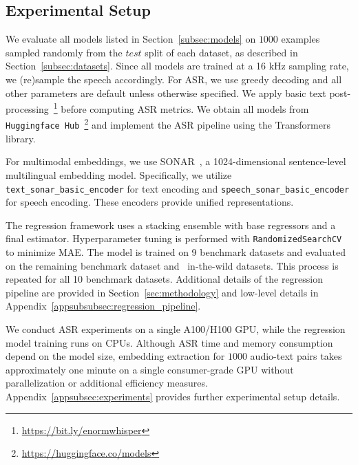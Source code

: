 \subsection{Experimental Setup}

We evaluate all models listed in Section~\ref{subsec:models} on $1000$ examples sampled randomly from the $test$ split of each dataset, as described in Section~\ref{subsec:datasets}. Since all models are trained at a 16 kHz sampling rate, we (re)sample the speech accordingly. For ASR, we use greedy decoding and all other parameters are default unless otherwise specified. We apply basic text post-processing~\footnote{\url{https://bit.ly/enormwhisper}} before computing ASR metrics. We obtain all models from \texttt{Huggingface Hub}~\footnote{\url{https://huggingface.co/models}} and implement the ASR pipeline using the Transformers~\cite{wolf2020huggingfacestransformersstateoftheartnatural} library.

For multimodal embeddings, we use SONAR~\cite{duquenne2023sonar}, a 1024-dimensional sentence-level multilingual embedding model. Specifically, we utilize \texttt{text\_sonar\_basic\_encoder} for text encoding and \texttt{speech\_sonar\_basic\_encoder} for speech encoding. These encoders provide unified representations.

The regression framework uses a stacking ensemble with base regressors and a final estimator. Hyperparameter tuning is performed with \texttt{RandomizedSearchCV} to minimize MAE. The model is trained on 9 benchmark datasets and evaluated on the remaining benchmark dataset and {\nwilds}~in-the-wild datasets. This process is repeated for all 10 benchmark datasets. Additional details of the regression pipeline are provided in Section~\ref{sec:methodology} and low-level details in Appendix~\ref{appsubsubsec:regression_pipeline}. 

We conduct ASR experiments on a single A100/H100 GPU, while the regression model training runs on CPUs. Although ASR time and memory consumption depend on the model size, embedding extraction for $1000$ audio-text pairs takes approximately one minute on a single consumer-grade GPU without parallelization or additional efficiency measures. Appendix~\ref{appsubsec:experiments} provides further experimental setup details.



